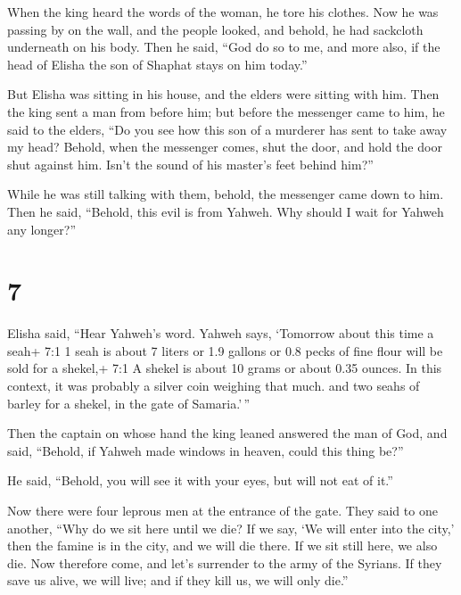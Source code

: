  When the king heard the words of the woman, he tore his
clothes. Now he was passing by on the wall, and the people looked, and
behold, he had sackcloth underneath on his body.  Then he
said, ``God do so to me, and more also, if the head of Elisha the son of
Shaphat stays on him today.''

 But Elisha was sitting in his house, and the elders were
sitting with him. Then the king sent a man from before him; but before
the messenger came to him, he said to the elders, ``Do you see how this
son of a murderer has sent to take away my head? Behold, when the
messenger comes, shut the door, and hold the door shut against him.
Isn't the sound of his master's feet behind him?''

 While he was still talking with them, behold, the
messenger came down to him. Then he said, ``Behold, this evil is from
Yahweh. Why should I wait for Yahweh any longer?''

\hypertarget{section-6}{%
\section{7}\label{section-6}}

 Elisha said, ``Hear Yahweh's word. Yahweh says, `Tomorrow
about this time a seah+ 7:1 1 seah is about 7 liters or 1.9 gallons or
0.8 pecks of fine flour will be sold for a shekel,+ 7:1 A shekel is
about 10 grams or about 0.35 ounces. In this context, it was probably a
silver coin weighing that much. and two seahs of barley for a shekel, in
the gate of Samaria.'\,''

 Then the captain on whose hand the king leaned answered the
man of God, and said, ``Behold, if Yahweh made windows in heaven, could
this thing be?''

He said, ``Behold, you will see it with your eyes, but will not eat of
it.''

 Now there were four leprous men at the entrance of the
gate. They said to one another, ``Why do we sit here until we die?
 If we say, `We will enter into the city,' then the famine
is in the city, and we will die there. If we sit still here, we also
die. Now therefore come, and let's surrender to the army of the Syrians.
If they save us alive, we will live; and if they kill us, we will only
die.''

